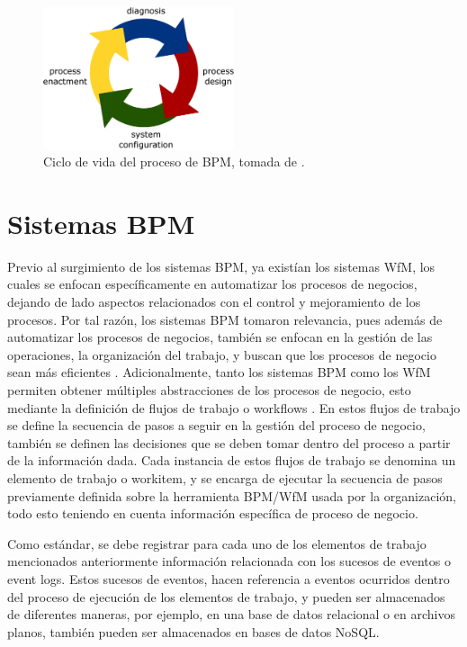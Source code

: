 \begin{figure}[htbp!] 
    \centering    
    \includegraphics[width=0.5\textwidth]{Chapter1/Figs/Vector/Figure_lifecycle.eps}
    \caption[Ciclo de vida del proceso de BPM]{Ciclo de vida del proceso de BPM, tomada de \cite[Fig.~2]{VanderAalst2004}.}
    \label{fig:CicloVida}
\end{figure}

\section{Sistemas BPM} %
\label{section1.2}

Previo al surgimiento de los sistemas BPM, ya existían los sistemas WfM, los cuales se enfocan específicamente en automatizar los procesos de negocios, dejando de lado aspectos relacionados con el control y mejoramiento de los procesos. Por tal razón, los sistemas BPM tomaron relevancia, pues además de automatizar los procesos de negocios, también se enfocan en la gestión de las operaciones, la organización del trabajo, y buscan que los procesos de negocio sean más eficientes \cite{VanderAalst2013,VanderAalst2016}. Adicionalmente, tanto los sistemas BPM como los WfM permiten obtener múltiples abstracciones de los procesos de negocio, esto mediante la definición de flujos de trabajo o workflows \cite{VanderAalst2004}. En estos flujos de trabajo se define la secuencia de pasos a seguir en la gestión del proceso de negocio, también se definen las decisiones que se deben tomar dentro del proceso a partir de la información dada. Cada instancia de estos flujos de trabajo se denomina un elemento de trabajo o workitem, y se encarga de ejecutar la secuencia de pasos previamente definida sobre la herramienta BPM/WfM usada por la organización, todo esto teniendo en cuenta información específica de proceso de negocio. 

Como estándar, se debe registrar para cada uno de los elementos de trabajo mencionados anteriormente información relacionada con los sucesos de eventos o event logs. Estos sucesos de eventos, hacen referencia a eventos ocurridos dentro del proceso de ejecución de los elementos de trabajo, y pueden ser almacenados de diferentes maneras, por ejemplo, en una base de datos relacional o en archivos planos, también pueden ser almacenados en bases de datos NoSQL. 

